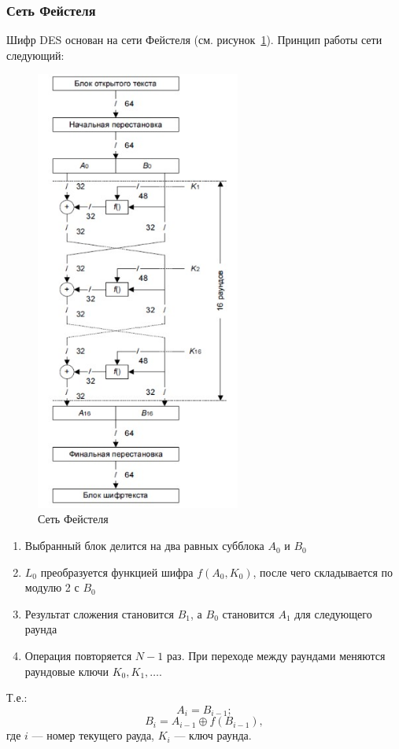 \documentclass[a4paper, 14pt]{extarticle}
\begin{document}
\subsubsection{Сеть Фейстеля}
Шифр DES основан на сети Фейстеля (см. рисунок~\ref{img:1:1}). Принцип работы сети следующий:

\begin{figure}[h]
    \centering
    \includegraphics[width=0.6\textwidth]{./img/S001.jpg}
    \caption{Сеть Фейстеля}%
    \label{img:1:1}
\end{figure}

\begin{enumerate}
    \item Выбранный блок делится на два равных субблока $A_0$ и $B_0$
    \item $L_0$ преобразуется функцией шифра $f(A_0, K_0)$, после чего складывается по модулю 2 с $B_0$
    \item Результат сложения становится $B_1$, а $B_0$ становится $A_1$ для следующего раунда
    \item Операция повторяется $N-1$ раз. При переходе между раундами меняются раундовые ключи $K_0, K_1, \ldots $.\\
\end{enumerate}
Т.е.:
\[ A_i = B_{i-1}; \]
\[ B_i = A_{i-1} \oplus f(B_{i-1}), \] 
где $i$ --- номер текущего рауда, $K_i$ --- ключ раунда.
\end{document}

